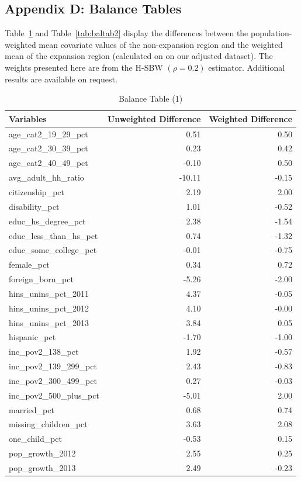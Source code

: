 \documentclass[12pt]{article}
\begin{document}
\subsection{Appendix D: Balance Tables}
\label{ssec:balancetables}

Table~\ref{tab:baltab1} and Table~\ref{tab:baltab2} display the differences between the population-weighted mean covariate values of the non-expansion region and the weighted mean of the expansion region (calculated on on our adjusted dataset). The weights presented here are from the H-SBW $(\rho = 0.2)$ estimator. Additional results are available on request.

\begin{table}[ht]
\centering
\begin{tabular}{lrr}
  \toprule
Variables & Unweighted Difference & Weighted Difference \\ 
  \midrule
age\_cat2\_19\_29\_pct & 0.51 & 0.50 \\ 
  age\_cat2\_30\_39\_pct & 0.23 & 0.42 \\ 
  age\_cat2\_40\_49\_pct & -0.10 & 0.50 \\ 
  avg\_adult\_hh\_ratio & -10.11 & -0.15 \\ 
  citizenship\_pct & 2.19 & 2.00 \\ 
  disability\_pct & 1.01 & -0.52 \\ 
  educ\_hs\_degree\_pct & 2.38 & -1.54 \\ 
  educ\_less\_than\_hs\_pct & 0.74 & -1.32 \\ 
  educ\_some\_college\_pct & -0.01 & -0.75 \\ 
  female\_pct & 0.34 & 0.72 \\ 
  foreign\_born\_pct & -5.26 & -2.00 \\ 
  hins\_unins\_pct\_2011 & 4.37 & -0.05 \\ 
  hins\_unins\_pct\_2012 & 4.10 & -0.00 \\ 
  hins\_unins\_pct\_2013 & 3.84 & 0.05 \\ 
  hispanic\_pct & -1.70 & -1.00 \\ 
  inc\_pov2\_138\_pct & 1.92 & -0.57 \\ 
  inc\_pov2\_139\_299\_pct & 2.43 & -0.83 \\ 
  inc\_pov2\_300\_499\_pct & 0.27 & -0.03 \\ 
  inc\_pov2\_500\_plus\_pct & -5.01 & 2.00 \\ 
  married\_pct & 0.68 & 0.74 \\ 
  missing\_children\_pct & 3.63 & 2.08 \\ 
  one\_child\_pct & -0.53 & 0.15 \\ 
  pop\_growth\_2012 & 2.55 & 0.25 \\ 
  pop\_growth\_2013 & 2.49 & -0.23 \\ 
   \bottomrule
    \end{tabular}
    \caption{Balance Table (1)}
    \label{tab:baltab1}
\end{table}
\end{document}
